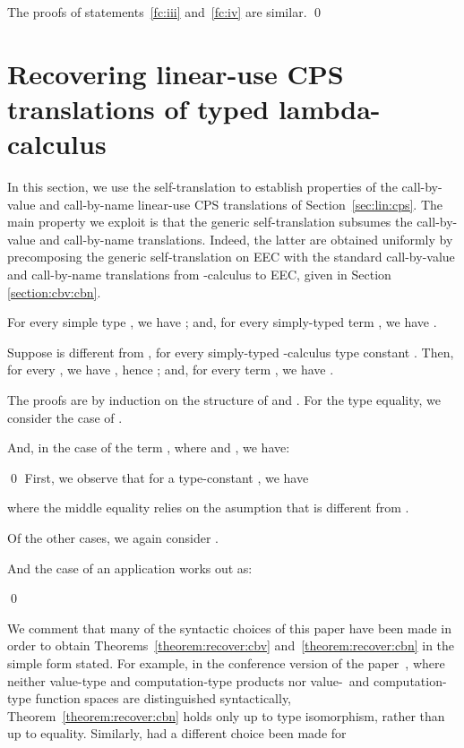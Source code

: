 \documentclass{LMCS}
\begin{document}
The proofs of statements~\ref{fc:iii} and~\ref{fc:iv} are similar.
\qed



\def\Groupoid{\mathbf{Grpd}}
\def\cni{{cni}}
\def\fudgey{sufficiently bicomplete}

\section{Recovering linear-use CPS translations of typed lambda-calculus}
\label{section:recovering}

In this section, we use the self-translation to establish properties
of the call-by-value and call-by-name linear-use CPS translations
of Section~\ref{sec:lin:cps}. The main property we exploit 
is that  the generic self-translation 
subsumes  the call-by-value
and call-by-name translations.
Indeed, the latter are obtained uniformly by precomposing the
generic self-translation on EEC with 
the standard call-by-value and call-by-name translations
from -calculus to EEC, given in Section \ref{section:cbv:cbn}.

\begin{thm}[Recovering ]
\label{theorem:recover:cbv}
For every simple type , we have 
; and, for
every simply-typed term , we have 
.
\end{thm}

\begin{thm}[Recovering ]
\label{theorem:recover:cbn}
Suppose  is different from , for every
simply-typed -calculus type constant .
Then, for every , 
we have 
, hence
; and, for
every term , we have 
.
\end{thm}
\noindent
The  proofs are by induction on the structure of  and . 
For the type equality,  we consider the case of .

And, in the case of the term , where 
and , we have:

\qed
{}
First, we observe that for a type-constant , we have

where the middle equality relies on the asumption that 
 is different from .

Of the other cases, we again consider .

And the case of an application  works out as:

\qed

We comment that many of the syntactic choices of this paper have been  made 
in order to obtain Theorems~\ref{theorem:recover:cbv} and~\ref{theorem:recover:cbn}
in the simple form stated. For example, in the conference version of the paper~\cite{EMS:fossacs},
where neither value-type and computation-type products nor
value-\ and computation-type function spaces are distinguished syntactically,
Theorem~\ref{theorem:recover:cbn} holds only up to type isomorphism,
rather than up to equality. Similarly, had a different choice been made for
\end{document}
